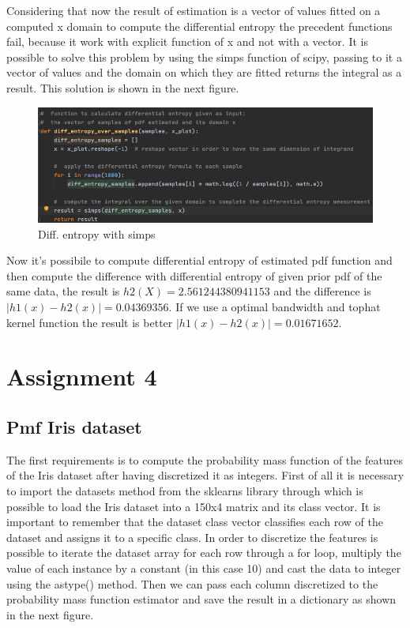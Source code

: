 \documentclass[12pt]{report}
\begin{document}
Considering that now the result of estimation is a vector of values fitted on a computed x domain to compute the differential entropy the precedent functions fail, because it work with explicit function of x and not with a vector. 
It is possible to solve this problem by using the simps function of scipy, passing to it a vector of values and the domain on which they are fitted returns the integral as a result. This solution is shown in the next figure.

\begin{figure}[h!]
    \centering
    \includegraphics[width=15cm]{Pictures/Simps scipy.png}
    \caption{Diff. entropy with simps}
\end{figure}

\newpage
Now it's possibile to compute differential entropy of estimated pdf function and then compute
the difference with differential entropy of given prior pdf of the same data, the result is 
$h2(X) = 2.561244380941153$ and 
the difference is $|h1(x) - h2(x)| = 0.04369356$. If we use a optimal bandwidth and tophat kernel function the result is 
better $|h1(x) - h2(x)| = 0.01671652$.



\chapter{Assignment 4}

\section{Pmf Iris dataset}
The first requirements is to compute the probability mass function of the features of the Iris dataset after having discretized it as integers. First of all it is necessary to import the datasets method from the sklearns library through
which is possible to load the Iris dataset into a 150x4 matrix and its class vector. It is important to remember that the dataset class vector classifies each row of the dataset and assigns it to a specific class. In order to discretize the features is 
possible to iterate the dataset array for each row through a for loop, multiply the value of 
each instance by a constant (in this case 10) and cast the data to integer using the astype() method. Then we can pass each column discretized to the probability mass function estimator and save the result in a dictionary as shown in the next 
figure.
\end{document}
